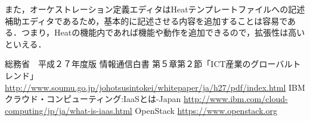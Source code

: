\documentclass[mingoth]{kut-paper}		%
\begin{document}
	また，オーケストレーション定義エディタはHeatテンプレートファイルへの記述補助エディタであるため，基本的に記述させる内容を追加することは容易である．つまり，Heatの機能内であれば機能や動作を追加できるので，拡張性は高いといえる．


\begin{acknowledgement}
%
\end{acknowledgement}


\begin{thebibliography}{99}
%
総務省　平成２７年度版 情報通信白書 第５章第２節「ICT産業のグローバルトレンド」 				\url{http://www.soumu.go.jp/johotsusintokei/whitepaper/ja/h27/pdf/index.html}
IBMクラウド・コンピューティング:IaaSとは-Japan
\url{http://www.ibm.com/cloud-computing/jp/ja/what-is-iaas.html}
OpenStack
\url{https://www.openstack.org}
\end{thebibliography}



%

%
\end{document}
